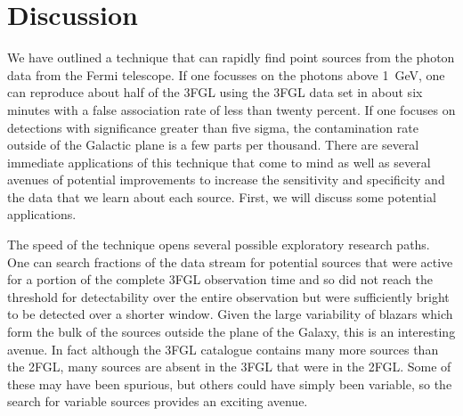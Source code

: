 \documentclass[useAMS,usenatbib]{mn2e}
\begin{document}
\section{Discussion}
\label{sec:discussion}

We have outlined a technique that can rapidly find point sources from
the photon data from the Fermi telescope.  If one focusses on the
photons above 1~GeV, one can reproduce about half of the 3FGL using
the 3FGL data set in about six minutes with a false association rate
of less than twenty percent. If one focuses on detections with
significance greater than five sigma, the contamination rate outside
of the Galactic plane is a few parts per thousand. There are several
immediate applications of this technique that come to mind as well as
several avenues of potential improvements to increase the sensitivity
and specificity and the data that we learn about each source.  First,
we will discuss some potential applications.

The speed of the technique opens several possible exploratory research
paths.  One can search fractions of the data stream for potential
sources that were active for a portion of the complete 3FGL observation
time and so did not reach the threshold for detectability over the
entire observation but were sufficiently bright to be detected over a
shorter window.  Given the large variability of blazars which form the
bulk of the sources outside the plane of the Galaxy, this is an
interesting avenue.  In fact although the 3FGL catalogue contains many
more sources than the 2FGL, many sources are absent in the 3FGL that
were in the 2FGL.  Some of these may have been spurious, but others
could have simply been variable, so the search for variable sources
provides an exciting avenue.
\end{document}
